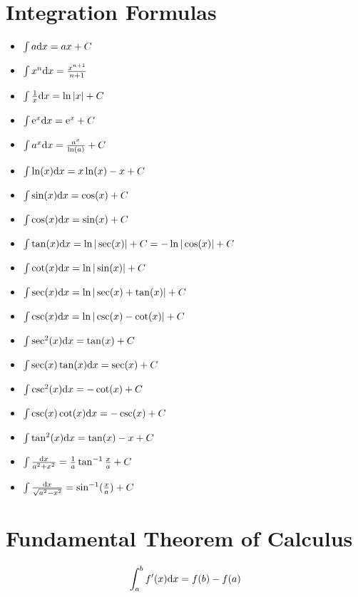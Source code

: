 \documentclass{math}
\begin{document}
\section{Integration Formulas}
\begin{itemize}
  \item \( \int{a\mathrm{d}{x} = ax+C} \)
  \item \( \int{x^{n}\mathrm{d}{x}} = \frac{x^{n+1}}{n + 1} \)
  \item \( \int{\frac{1}{x}\mathrm{d}{x} = \ln|x|+C} \)
  \item \( \int{\mathrm{e}^{x}\mathrm{d}{x} = \mathrm{e}^{x}+C} \)
  \item \( \int{a^{x}\mathrm{d}{x} = \frac{a^{x}}{\ln(a)}+C} \)
  \item \( \int{\ln(x)\mathrm{d}{x} = x\ln(x)-x+C} \)
  \item \( \int{\sin(x)\mathrm{d}{x} = \cos(x)+C} \)
  \item \( \int{\cos(x)\mathrm{d}{x} = \sin(x)+C} \)
  \item \( \int{\tan(x)\mathrm{d}{x} = \ln|\sec(x)|+C = -\ln|\cos(x)|+C} \)
  \item \( \int{\cot(x)\mathrm{d}{x} = \ln|\sin(x)|+C} \)
  \item \( \int{\sec(x)\mathrm{d}{x} = \ln|\sec(x)+\tan(x)|+C} \)
  \item \( \int{\csc(x)\mathrm{d}{x} = \ln|\csc(x)-\cot(x)|+C} \)
  \item \( \int{\sec^{2}(x)\mathrm{d}{x} = \tan(x)+C} \)
  \item \( \int{\sec(x)\tan(x)\mathrm{d}{x} = \sec(x)+C} \)
  \item \( \int{\csc^{2}(x)\mathrm{d}{x} = -\cot(x)+C} \)
  \item \( \int{\csc(x)\cot(x)\mathrm{d}{x} = -\csc(x)+C} \)
  \item \( \int{\tan^{2}(x)\mathrm{d}{x} = \tan(x)-x+C} \)
  \item \( \int{\frac{\mathrm{d}{x}}{a^{2}+x^{2}} =
          \frac{1}{a}\tan^{-1}{\frac{x}{a}}+C} \)
  \item \( \int{\frac{\mathrm{d}{x}}{\sqrt{a^{2}-x^{2}}} = \sin^{-1}(\frac{x}{a})+C} \)
\end{itemize}

\section{Fundamental Theorem of Calculus}
\[ \int_{a}^{b}{f'(x)\mathrm{d}{x} = f(b) - f(a)} \]
\end{document}

